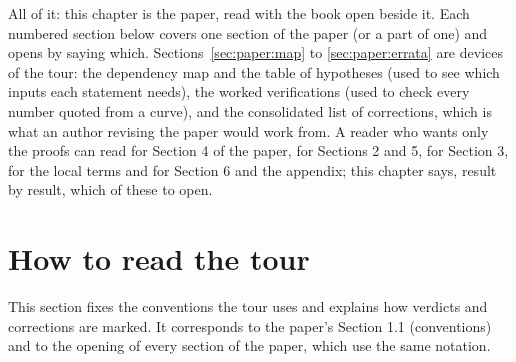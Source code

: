 \begin{sloppypar}
All of it: this chapter is the paper, read with the book open beside it. Each numbered section below covers one section of the paper (or a part of
one) and opens by saying which. Sections~\ref{sec:paper:map} to \ref{sec:paper:errata} are devices of the tour: the dependency map and the table of
hypotheses (used to see which inputs each statement needs), the worked verifications (used to check every number quoted from a curve), and the
consolidated list of corrections, which is what an author revising the paper would work from. A reader who wants only the proofs can read
 for Section 4 of the paper,  for Sections 2 and 5,  for Section 3,
 for the local terms and  for Section 6 and the appendix; this chapter says, result by result, which
of these to open.

\section{How to read the tour}\label{sec:paper:reading}

This section fixes the conventions the tour uses and explains how verdicts and corrections are marked. It corresponds to the paper's Section 1.1
(conventions) and to the opening of every section of the paper, which use the same notation.


\end{sloppypar}
